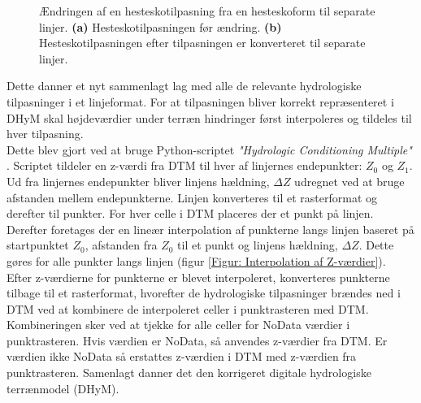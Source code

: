 \begin{figure}[H]
\begin{subfigure}[t]{0.5\textwidth}
        \caption{}
        \label{Subfig: Hesteskotilpasning efter tilpasningen er konverteret til linjer}
    \end{subfigure}
    \caption{Ændringen af en hesteskotilpasning fra en hesteskoform til separate linjer. \textbf{(a)} Hesteskotilpasningen før ændring. \textbf{(b)} Hesteskotilpasningen efter tilpasningen er konverteret til separate linjer.}
    \label{Figur: Ændringen af hesteskotilpasningerne}
\end{figure}

Dette danner et nyt sammenlagt lag med alle de relevante hydrologiske tilpasninger i et linjeformat. For at tilpasningen bliver korrekt repræsenteret i DHyM skal højdeværdier under terræn hindringer først interpoleres og tildeles til hver tilpasning.\\
Dette blev gjort ved at bruge Python-scriptet \textit{"Hydrologic Conditioning Multiple"} \citep{balstrom_identification_2024}. Scriptet tildeler en z-værdi fra DTM til hver af linjernes endepunkter: $Z_0$ og $Z_1$. Ud fra linjernes endepunkter bliver linjens hældning, $\Delta{Z}$ udregnet ved at bruge afstanden mellem endepunkterne. Linjen konverteres til et rasterformat og derefter til punkter. For hver celle i DTM placeres der et punkt på linjen. Derefter foretages der en lineær interpolation af punkterne langs linjen baseret på startpunktet $Z_0$, afstanden fra $Z_0$ til et punkt og linjens hældning, $\Delta{Z}$. Dette gøres for alle punkter langs linjen (figur \ref{Figur: Interpolation af Z-værdier}). \\

Efter z-værdierne for punkterne er blevet interpoleret, konverteres punkterne tilbage til et rasterformat, hvorefter de hydrologiske tilpasninger brændes ned i DTM ved at kombinere de interpoleret celler i punktrasteren med DTM. Kombineringen sker ved at tjekke for alle celler for NoData værdier i punktrasteren. Hvis værdien er NoData, så anvendes z-værdier fra DTM. Er værdien ikke NoData så erstattes z-værdien i DTM med z-værdien fra punktrasteren.
Samenlagt danner det den korrigeret digitale hydrologiske terrænmodel (DHyM).

